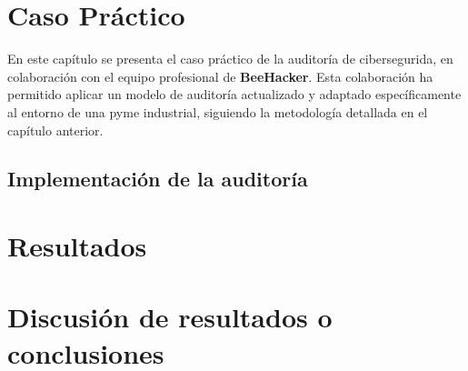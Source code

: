 \documentclass[a4paper, 10pt]{article}
\begin{document}
\section{Caso Práctico}

En este capítulo se presenta el caso práctico de la auditoría de cibersegurida, en colaboración con el equipo profesional de \textbf{BeeHacker}. Esta colaboración ha permitido aplicar un modelo de auditoría actualizado y adaptado específicamente al entorno de una pyme industrial, siguiendo la metodología detallada en el capítulo anterior.


\subsection{Implementación de la auditoría}


\clearpage

\section{Resultados}



\clearpage

\section{Discusión de resultados o conclusiones}



\clearpage
\end{document}
